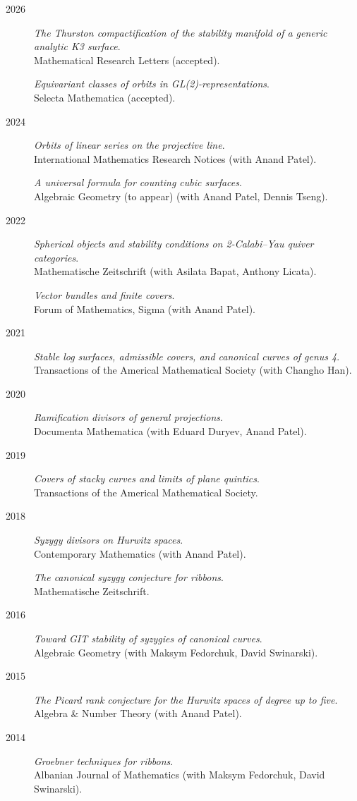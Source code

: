 \documentclass[11pt]{article}
\begin{document}
\label{org198edb4}
\begin{description}
\item[{2026}] \emph{The Thurston compactification of the stability manifold of a generic analytic K3 surface}.\\
Mathematical Research Letters (accepted).

\emph{Equivariant classes of orbits in GL(2)-representations}.\\
Selecta Mathematica (accepted).
\item[{2024}] \emph{Orbits of linear series on the projective line}.\\
International Mathematics Research Notices (with Anand Patel).

\emph{A universal formula for counting cubic surfaces}.\\
Algebraic Geometry (to appear) (with Anand Patel, Dennis Tseng).
\item[{2022}] \emph{Spherical objects and stability conditions on 2-Calabi--Yau quiver categories}.\\
Mathematische Zeitschrift (with Asilata Bapat, Anthony Licata).

\emph{Vector bundles and finite covers}.\\
Forum of Mathematics, Sigma (with Anand Patel).
\item[{2021}] \emph{Stable log surfaces, admissible covers, and canonical curves of genus 4}.\\
Transactions of the Americal Mathematical Society (with Changho Han).
\item[{2020}] \emph{Ramification divisors of general projections}.\\
Documenta Mathematica (with Eduard Duryev, Anand Patel).
\item[{2019}] \emph{Covers of stacky curves and limits of plane quintics}.\\
Transactions of the Americal Mathematical Society.
\item[{2018}] \emph{Syzygy divisors on Hurwitz spaces}.\\
Contemporary Mathematics (with Anand Patel).

\emph{The canonical syzygy conjecture for ribbons}.\\
Mathematische Zeitschrift.
\item[{2016}] \emph{Toward GIT stability of syzygies of canonical curves}.\\
Algebraic Geometry (with Maksym Fedorchuk, David Swinarski).
\item[{2015}] \emph{The Picard rank conjecture for the Hurwitz spaces of degree up to five}.\\
Algebra \& Number Theory (with Anand Patel).
\item[{2014}] \emph{Groebner techniques for ribbons}.\\
Albanian Journal of Mathematics (with Maksym Fedorchuk, David Swinarski).


\end{description}
\end{document}
